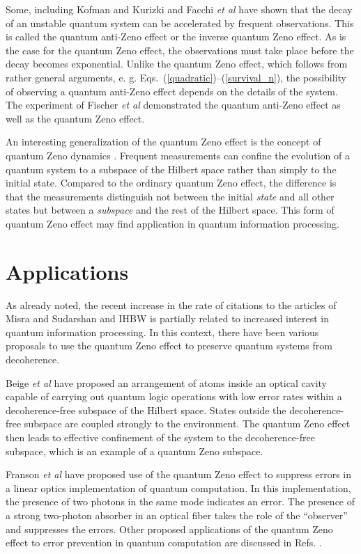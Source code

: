 \documentclass[12pt]{article}
\begin{document}
Some, including Kofman and Kurizki \cite{kofman00} and Facchi {\em
et al} \cite{facchi01} have shown that the decay of an unstable
quantum system can be accelerated by frequent observations.  This is
called the quantum anti-Zeno effect or the inverse quantum Zeno
effect.  As is the case for the quantum Zeno effect, the
observations must take place before the decay becomes exponential.
Unlike the quantum Zeno effect, which follows from rather general
arguments, e. g. Eqs.~(\ref{quadratic})--(\ref{survival_n}), the
possibility of observing a quantum anti-Zeno effect depends on the
details of the system. The experiment of Fischer {\em et al}
\cite{fischer01} demonstrated the quantum anti-Zeno effect as well
as the quantum Zeno effect. 

An interesting generalization of the quantum Zeno effect is the
concept of quantum Zeno dynamics \cite{facchi00,facchi02}.  Frequent
measurements can confine the evolution of a quantum system to a
subspace of the Hilbert space rather than simply to the initial
state.  Compared to the ordinary quantum Zeno effect, the difference
is that the measurements distinguish not between the initial {\em
state} and all other states but between a {\em subspace} and the
rest of the Hilbert space. This form of quantum Zeno effect may find
application in quantum information processing.


\section{Applications}

As already noted, the recent increase in the rate of citations to
the articles of Misra and Sudarshan \cite{misra77} and IHBW
\cite{itano90} is partially related to increased interest in quantum
information processing.  In this context, there have been various
proposals to use the quantum Zeno effect to preserve quantum systems
from decoherence.

Beige {\em et al} \cite{beige00} have proposed an arrangement of
atoms inside an optical cavity capable of carrying out quantum logic
operations with low error rates within a decoherence-free subspace
of the Hilbert space. States outside the decoherence-free subspace
are coupled strongly to the environment. The quantum Zeno effect
then leads to effective confinement of the system to the
decoherence-free subspace, which is an example of a quantum Zeno
subspace.

Franson {\em et al} \cite{franson04} have proposed use of the
quantum Zeno effect to suppress errors in a linear optics
implementation of quantum computation. In this implementation, the
presence of two photons in the same mode indicates an error. The
presence of a strong two-photon absorber in an optical fiber takes
the role of the ``observer'' and suppresses the errors. Other
proposed applications of the quantum Zeno effect to error prevention
in quantum computation are discussed in Refs.
\cite{zurek84,vaidman96,pachos02,ralph03}.
\end{document}

